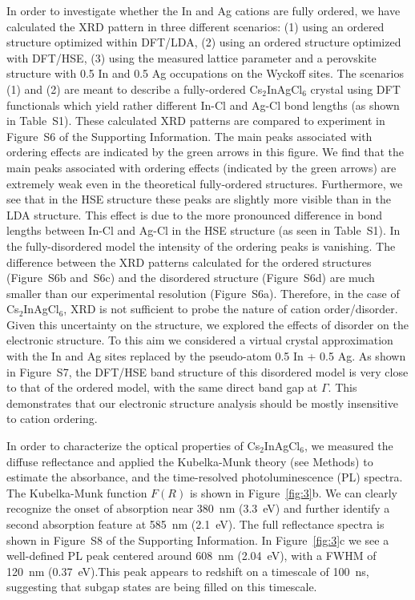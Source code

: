\documentclass[journal=jpcl,manuscript=letter,layout=traditional]{achemso}
\begin{document}
In order to investigate whether the In and Ag cations are fully ordered,
we have calculated the XRD pattern in three different
scenarios: (1) using an ordered structure optimized within DFT/LDA, (2) using an ordered structure
optimized with DFT/HSE, (3) using the measured lattice parameter and a perovskite structure with
0.5 In and 0.5 Ag occupations on the Wyckoff sites. The scenarios (1) and (2) are meant to
describe a fully-ordered Cs$_2$InAgCl$_6$ crystal using DFT functionals which
yield rather different In-Cl and Ag-Cl bond lengths (as shown in Table~S1).
These calculated XRD patterns are compared to experiment in Figure~S6 of the Supporting Information.
The main peaks associated with ordering effects are indicated by the green arrows in this figure.
We find that the main peaks associated with ordering effects (indicated by the green arrows)
are extremely weak even in the theoretical fully-ordered structures.
Furthermore, we see that in the HSE structure these peaks are slightly more visible than in the LDA
structure. This effect is due to the more pronounced difference in bond lengths between In-Cl and Ag-Cl
in the HSE structure (as seen in Table~S1). In the fully-disordered model the intensity of the
ordering peaks is vanishing.
The difference between the XRD patterns calculated for the ordered structures (Figure~S6b and~S6c)
and the disordered structure (Figure~S6d) are much smaller than our experimental resolution (Figure~S6a).
Therefore, in the case of
Cs$_2$InAgCl$_6$, XRD is not sufficient to probe the nature of cation order/disorder.
Given this uncertainty on the structure, we explored the
effects of disorder on the electronic structure. To this aim we considered a virtual crystal
approximation with the In and Ag sites replaced by the pseudo-atom 0.5 In + 0.5 Ag.
As shown in Figure~S7, the DFT/HSE band structure of this disordered model
is very close to that of the ordered model, with the same direct band gap at $\Gamma$.
This demonstrates that our electronic structure analysis should be mostly insensitive to cation
ordering.

In order to characterize the optical properties of Cs$_2$InAgCl$_6$, we measured the diffuse
reflectance and applied the Kubelka-Munk theory (see Methods) to estimate the absorbance, and
the time-resolved photoluminescence (PL) spectra. The Kubelka-Munk function $F(R)$
is shown in Figure~\ref{fig:3}b. We can clearly recognize the onset
of absorption near 380~nm (3.3~eV) and further identify a second absorption feature
at 585~nm (2.1~eV). The full reflectance spectra is shown in Figure~S8 of the Supporting Information.
In Figure~\ref{fig:3}c we see a well-defined PL peak centered around 608~nm (2.04~eV), with a
FWHM of 120~nm (0.37~eV).This peak appears to redshift on a timescale of 100~ns, suggesting that
subgap states are being filled on this timescale.
\end{document}
